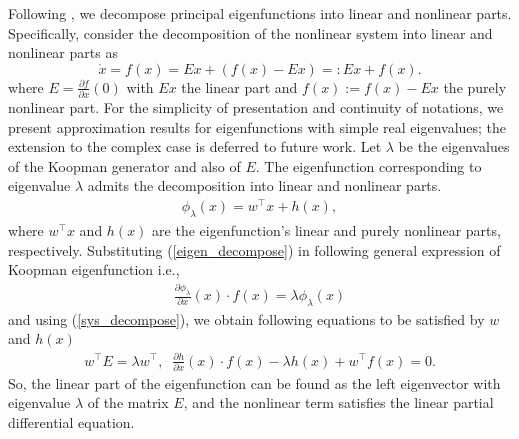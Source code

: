 \documentclass[11pt]{article}
\theoremstyle{plain}
\newcommand{\bF}{{\mathbf F}}
\newcommand{\bw}{{\mathbf w}}
\newcommand{\bE}{{\mathbf E}}
\def\[{\begin{equation}}
\def\]{\end{equation}}
\begin{document}



Following \cite{deka2023path}, we decompose principal eigenfunctions into linear and nonlinear parts. Specifically, consider the decomposition of the nonlinear system into linear and nonlinear parts as
 \begin{equation}
 \dot x=f(x)=Ex+(f(x)-E x)=:E x+ f(x)\label{sys_decompose}. \end{equation}
where $E=\frac{\partial f}{\partial x}(0)$ with $Ex$ the linear part and $f(x):=f(x)-Ex$ the purely nonlinear part. 
For the simplicity of presentation and continuity of notations, we present approximation results for eigenfunctions with simple real eigenvalues; the extension to the complex case is deferred to future work. Let $\lambda$ be the eigenvalues of the Koopman generator and also of $E$. The eigenfunction corresponding to eigenvalue $\lambda$ admits the decomposition into linear and nonlinear parts.
\begin{eqnarray}
 \phi_\lambda(x)=w^\top x+h(x) \label{eigen_decompose},
\end{eqnarray}
where $ w^\top x$ and $h(x)$ are the eigenfunction's linear and purely nonlinear parts, respectively. Substituting (\ref{eigen_decompose}) in following general expression of Koopman eigenfunction i.e.,
\begin{eqnarray}
 \frac{\partial \phi_\lambda}{\partial x}(x)
 \cdot
 f(x)=\lambda \phi_{\lambda}(x)
\end{eqnarray}
and using (\ref{sys_decompose}), we obtain following equations to be satisfied by $w$ and $h(x)$
\begin{eqnarray}
w^\top E=\lambda  w^\top,\;\;\frac{\partial h}{\partial x}(x) \cdot f(x)-\lambda h(x)+w^\top f(x)=0
\label{linear_nonlinear_eig}.
 \end{eqnarray}
So, the linear part of the eigenfunction can be found as the left eigenvector with eigenvalue $\lambda$ of the matrix $E$, and the nonlinear term satisfies the linear partial differential equation.
\end{document}
